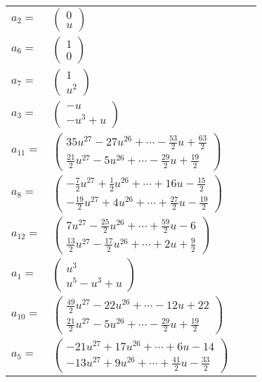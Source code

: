 \documentclass[1p]{elsarticle_modified}
\theoremstyle{definition}
\begin{document}
\begin{tabular}{m{7pt} m{180pt} m{7pt} m{180pt} }
\flushright $a_{2}=$&$\begin{pmatrix}0\\u\end{pmatrix}$ \\
\flushright $a_{6}=$&$\begin{pmatrix}1\\0\end{pmatrix}$ \\
\flushright $a_{7}=$&$\begin{pmatrix}1\\u^2\end{pmatrix}$ \\
\flushright $a_{3}=$&$\begin{pmatrix}- u\\- u^3+u\end{pmatrix}$ \\
\flushright $a_{11}=$&$\begin{pmatrix}35 u^{27}-27 u^{26}+\cdots-\frac{53}{2} u+\frac{63}{2}\\\frac{21}{2} u^{27}-5 u^{26}+\cdots-\frac{29}{2} u+\frac{19}{2}\end{pmatrix}$ \\
\flushright $a_{8}=$&$\begin{pmatrix}-\frac{7}{2} u^{27}+\frac{1}{2} u^{26}+\cdots+16 u-\frac{15}{2}\\-\frac{19}{2} u^{27}+4 u^{26}+\cdots+\frac{27}{2} u-\frac{19}{2}\end{pmatrix}$ \\
\flushright $a_{12}=$&$\begin{pmatrix}7 u^{27}-\frac{25}{2} u^{26}+\cdots+\frac{59}{2} u-6\\\frac{13}{2} u^{27}-\frac{17}{2} u^{26}+\cdots+2 u+\frac{9}{2}\end{pmatrix}$ \\
\flushright $a_{1}=$&$\begin{pmatrix}u^3\\u^5- u^3+u\end{pmatrix}$ \\
\flushright $a_{10}=$&$\begin{pmatrix}\frac{49}{2} u^{27}-22 u^{26}+\cdots-12 u+22\\\frac{21}{2} u^{27}-5 u^{26}+\cdots-\frac{29}{2} u+\frac{19}{2}\end{pmatrix}$ \\
\flushright $a_{5}=$&$\begin{pmatrix}-21 u^{27}+17 u^{26}+\cdots+6 u-14\\-13 u^{27}+9 u^{26}+\cdots+\frac{41}{2} u-\frac{33}{2}\end{pmatrix}$ \\

\end{tabular}
\end{document}
